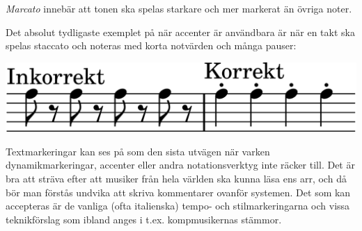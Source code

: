 \textit{Marcato} innebär att tonen ska spelas starkare och mer markerat än övriga noter.

Det absolut tydligaste exemplet på när accenter är användbara är när en takt ska spelas staccato och noteras med korta notvärden och många pauser:

\begin{center}
\includegraphics{lilypond/staccato.cropped.png}
\end{center}

Textmarkeringar kan ses på som den sista utvägen när varken dynamikmarkeringar, accenter eller andra notationsverktyg inte räcker till. Det är bra att sträva efter att musiker från hela världen ska kunna läsa ens arr, och då bör man förstås undvika att skriva kommentarer ovanför systemen. Det som kan accepteras är de vanliga (ofta italienska) tempo- och stilmarkeringarna och vissa teknikförslag som ibland anges i t.ex. kompmusikernas stämmor. 


